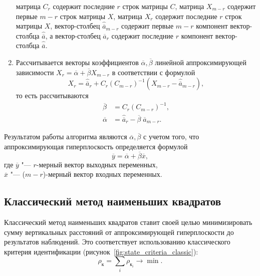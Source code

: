 \begin{enumerate}
  матрица \( C_{r} \)  содержит последние \( r \) строк матрицы \( C \),
  матрица \( X_{m-r} \) содержит первые \( m-r \) строк матрицы \( X \),
  матрица \( X_{r} \) содержит последние \( r \) строк матрицы \( X \),
  вектор-столбец \( \hat{\overline{a}}_{m-r} \) содержит первые \( m - r \) компонент
  вектор-столбца \( \hat{\overline{a}} \),
  а вектор-столбец \( \hat{\overline{a}}_{r} \) содержит последние \( r \) компонент
  вектор-столбца \( \hat{\overline{a}} \).
\item Рассчитывается векторы коэффициентов \( \overline{\alpha}, \overline{\beta} \)
  линейной аппроксимирующей зависимости
  \( X_r = \overline{\alpha} + \overline{\beta} X_{m-r}\)
  в соответствии с формулой
  \[ X_r = \hat{\overline{a}}_r + C_r (C_{m-r})^{-1} (X_{m-r} - \hat{\overline{a}}_{m-r}), \]
  то есть рассчитываются
  \begin{equation*}
    \begin{aligned}
      \overline{\beta} &= C_{r} (C_{m-r})^{-1}, \\
      \overline{\alpha} &= \hat{\overline{a}}_{r} - \overline{\beta} \; \hat{\overline{a}}_{m-r}.
    \end{aligned}
  \end{equation*}
\end{enumerate}

Результатом работы алгоритма являются \( \overline{\alpha}, \overline{\beta} \) с учетом того,
что аппроксимирующая гиперплоскость определяется формулой
\[ \overline{y} = \overline{\alpha} + \overline{\beta} \overline{x}, \]
где \( \overline{y} \) "--- \( r \)-мерный вектор выходных переменных, \\
\hspace*{7mm} \( \overline{x} \) "--- (\( m - r \))-мерный вектор входных переменных.

\subsection{Классический метод наименьших квадратов}\label{ssec:linear_method_classic}

Классический метод наименьших квадратов ставит своей целью минимизировать сумму
вертикальных расстояний от аппроксимирующей гиперплоскости до результатов наблюдений.
Это соответствует использованию классического критерия идентификации
(рисунок~\ref{fig:state_criteria_classic}):
\begin{equation*}
  \rho_{\text{к}} = \sum_i \rho_{\text{к}_i} \rightarrow \min.
\end{equation*}

